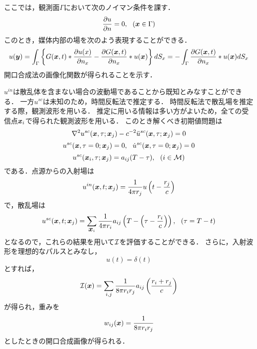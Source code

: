 ここでは，観測面$\Gamma$において次のノイマン条件を課す．
\begin{equation}
	\frac{\partial u}{\partial n}=0, \ \ (\fat{x} \in \Gamma)
	\label{eqn:}
\end{equation}
このとき，媒体内部の場を次のよう表現することができる．
\begin{equation}
	u(\mbox{\boldmath $y$})=
	\int_{\Gamma}
	\left\{
		G(\mbox{\boldmath $x$},t)*\frac{\partial u(x)}{\partial n_x}
	-
	\frac{\partial G(\mbox{\boldmath $x$},t)}{\partial n_x}*u(\mbox{\boldmath $x$})
	\right\}dS_x	
	=
	-\int_{\Gamma}
	\frac{\partial G(\mbox{\boldmath $x$},t)}{\partial n_x}*u(\mbox{\boldmath $x$})
	dS_x	
	\label{eqn:}
\end{equation}
開口合成法の画像化関数が得られることを示す．


$u^{in}$は散乱体を含まない場合の波動場であることから既知とみなすことができる．
一方$u^{sc}$は未知のため，時間反転法で推定する．
時間反転法で散乱場を推定する際，観測波形を用いる．
推定に用いる情報は多い方がよいため，全ての受信点$\mbox{\boldmath $x$}_i$で得られた観測波形を用いる．
このとき解くべき初期値問題は
\begin{equation}
	\nabla ^2 u^{sc}(\mbox{\boldmath $x$},\tau;\mbox{\boldmath $x$}_j)-c^{-2}\ddot{u}^{sc}(\mbox{\boldmath $x$},\tau; \mbox{\boldmath $x$}_j)=0
	\label{eqn:XXX_29}
\end{equation}
\begin{equation}
	u^{sc}(\fat{x},\tau=0;\fat{x}_j)=0, \ \ 
	\dot{u}^{sc}(\fat{x},\tau=0;\fat{x}_j)=0
	\label{eqn:XXX_30}
\end{equation}
\begin{equation}
	u^{sc}(\mbox{\boldmath $x$}_i,\tau;\mbox{\boldmath $x$}_j)=a_{ij}(T-\tau), \ \ (i \in {\cal M})
	\label{eqn:XXX_31}
\end{equation}
である．点源からの入射場は
\begin{equation}
	u^{in}(\mbox{\boldmath $x$},t;\mbox{\boldmath $x$}_j)=\frac{1}{4\pi r_j}u\left(t-\frac{r_j}{c}\right)
	\label{eqn:XXX_32}
\end{equation}
で，散乱場は
\begin{equation}
	u^{sc}(\mbox{\boldmath $x$},t;\mbox{\boldmath $x$}_j)=\sum_{\mbox{\boldmath $x$}_i}
	\frac{1}{4\pi r_i}a_{ij}\left(T-\left(\tau-\frac{r_i}{c}\right)\right), \ \ (\tau=T-t)
	\label{eqn:XXX_33}
\end{equation}
となるので，これらの結果を用いて$\cal I$を評価することができる．
さらに，入射波形を理想的なパルスとみなし，
\begin{equation}
	u(t)=\delta(t)
	\label{eqn:XXX_34}
\end{equation}
とすれば，
\begin{equation}
	{\cal I}(\mbox{\boldmath $x$})
	=
	\sum_{i,j} \frac{1}{8\pi r_ir_j} a_{ij} \left(\frac{r_i+r_j}{c}\right)
	\label{eqn:XXX_35}
\end{equation}
が得られ，重みを
\begin{equation}
	w_{ij}(\mbox{\boldmath $x$})=\frac{1}{8\pi r_ir_j} 
	\label{eqn:XXX_36}
\end{equation}
としたときの開口合成画像が得られる．











